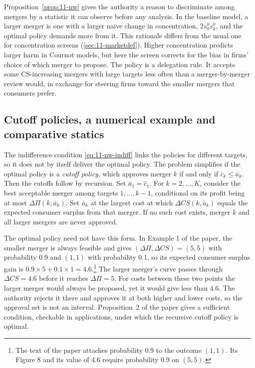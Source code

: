 Proposition~\ref{prop:11-nw} gives the authority a reason to discriminate among mergers by a statistic it can observe
before any analysis. In the baseline model, a larger merger is one with a larger naive change in concentration,
$2s_0^0s_k^0$, and the optimal policy demands more from it. This rationale differs from the usual one for concentration
screens (\cref{sec:11-marketdef}). Higher concentration predicts larger harm in Cournot models, but here the screen
corrects for the bias in firms' choice of which merger to propose. The policy is a delegation rule. It accepts some
CS-increasing mergers with large targets less often than a merger-by-merger review would, in exchange for steering firms
toward the smaller mergers that consumers prefer.

\subsection{Cutoff policies, a numerical example and comparative statics}\label{sec:11-nw-cutoffs}

The indifference condition \eqref{eq:11-nw-indiff} links the policies for different targets, so it does not by itself
deliver the optimal policy. The problem simplifies if the optimal policy is a \emph{cutoff policy}, which approves merger
$k$ if and only if $\bar c_k \le \bar a_k$. Then the cutoffs follow by recursion. Set $\bar a_1 = \hat c_1$. For $k = 2,
\dots, K$, consider the best acceptable merger among targets $1, \dots, k - 1$, conditional on its profit being at most
$\Delta\Pi(k, \bar a_k)$. Set $\bar a_k$ at the largest cost at which $\Delta\mathit{CS}(k, \bar a_k)$ equals the
expected consumer surplus from that merger. If no such cost exists, merger $k$ and all larger mergers are never approved.

The optimal policy need not have this form. In Example 1 of the paper, the smaller merger is always feasible and gives
$(\Delta\Pi, \Delta\mathit{CS}) = (5, 5)$ with probability 0.9 and $(1, 1)$ with probability 0.1, so its expected
consumer surplus gain is $0.9 \times 5 + 0.1 \times 1 = 4.6$.\footnote{The text of the paper attaches probability 0.9
to the outcome $(1, 1)$. Its Figure 8 and its value of 4.6 require probability 0.9 on $(5, 5)$.} The larger merger's curve passes through $\Delta\mathit{CS} = 4.6$ before it reaches
$\Delta\Pi = 5$. For costs between these two points the larger merger would always be proposed, yet it would give less
than 4.6. The authority rejects it there and approves it at both higher and lower costs, so the approval set is not an
interval. Proposition~2 of the paper gives a sufficient condition, checkable in applications, under which the recursive
cutoff policy is optimal.

